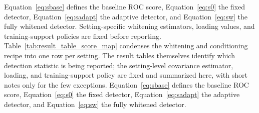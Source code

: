 \documentclass[11pt]{article}
\newif\ifPAPERONLY
\begin{document}
\ifPAPERONLY
Equation~\eqref{eq:sbase} defines the baseline ROC score, Equation~\eqref{eq:s0} the fixed detector, Equation~\eqref{eq:sadapt} the adaptive detector, and Equation~\eqref{eq:sw} the fully whitened detector. Setting-specific whitening estimators, loading values, and training-support policies are fixed before reporting.
\else
Table~\ref{tab:result_table_score_map} condenses the whitening and conditioning recipe into one row per setting. The result tables themselves identify which detection statistic is being reported; the setting-level covariance estimator, loading, and training-support policy are fixed and summarized here, with short notes only for the few exceptions. Equation~\eqref{eq:sbase} defines the baseline ROC score, Equation~\eqref{eq:s0} the fixed detector, Equation~\eqref{eq:sadapt} the adaptive detector, and Equation~\eqref{eq:sw} the fully whitened detector.
\end{document}
